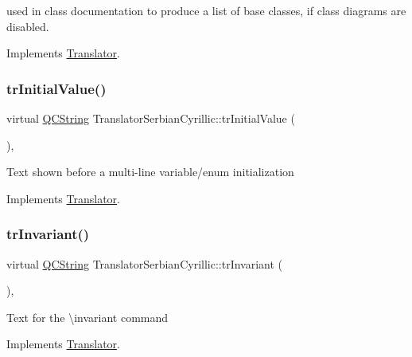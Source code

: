 used in class documentation to produce a list of base classes, if class diagrams are disabled. 

Implements \mbox{\hyperlink{class_translator}{Translator}}.

\mbox{\label{class_translator_serbian_cyrillic_a65435f55869fe7b42a85b5165c72bf37}} 
\subsubsection{\texorpdfstring{trInitialValue()}{trInitialValue()}}
{\footnotesize\ttfamily virtual \mbox{\hyperlink{class_q_c_string}{Q\+C\+String}} Translator\+Serbian\+Cyrillic\+::tr\+Initial\+Value (\begin{DoxyParamCaption}{ }\end{DoxyParamCaption})\hspace{0.3cm}{\ttfamily [inline]}, {\ttfamily [virtual]}}

Text shown before a multi-\/line variable/enum initialization 

Implements \mbox{\hyperlink{class_translator}{Translator}}.

\mbox{\label{class_translator_serbian_cyrillic_a32467041236c726688770702ecba34fc}} 
\subsubsection{\texorpdfstring{trInvariant()}{trInvariant()}}
{\footnotesize\ttfamily virtual \mbox{\hyperlink{class_q_c_string}{Q\+C\+String}} Translator\+Serbian\+Cyrillic\+::tr\+Invariant (\begin{DoxyParamCaption}{ }\end{DoxyParamCaption})\hspace{0.3cm}{\ttfamily [inline]}, {\ttfamily [virtual]}}

Text for the \textbackslash{}invariant command 

Implements \mbox{\hyperlink{class_translator}{Translator}}.

\mbox{\label{class_translator_serbian_cyrillic_a75d750ec709bd32814486d1a62e7d2bc}} 
